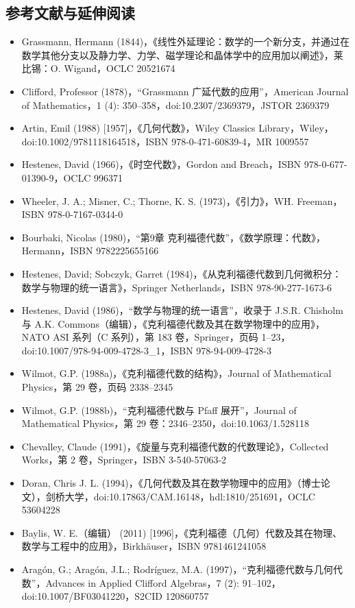 \subsection{参考文献与延伸阅读}
\begin{itemize}
\item Grassmann, Hermann (1844)，《线性外延理论：数学的一个新分支，并通过在数学其他分支以及静力学、力学、磁学理论和晶体学中的应用加以阐述》，莱比锡：O. Wigand，OCLC 20521674
\item Clifford, Professor (1878)，“Grassmann 广延代数的应用”，American Journal of Mathematics，1 (4): 350–358，doi:10.2307/2369379，JSTOR 2369379
\item Artin, Emil (1988) [1957]，《几何代数》，Wiley Classics Library，Wiley，doi:10.1002/9781118164518，ISBN 978-0-471-60839-4，MR 1009557
\item Hestenes, David (1966)，《时空代数》，Gordon and Breach，ISBN 978-0-677-01390-9，OCLC 996371
\item Wheeler, J. A.; Misner, C.; Thorne, K. S. (1973)，《引力》，W\.H. Freeman，ISBN 978-0-7167-0344-0
\item Bourbaki, Nicolas (1980)，“第9章 克利福德代数”，《数学原理：代数》，Hermann，ISBN 9782225655166
\item Hestenes, David; Sobczyk, Garret (1984)，《从克利福德代数到几何微积分：数学与物理的统一语言》，Springer Netherlands，ISBN 978-90-277-1673-6
\item Hestenes, David (1986)，“数学与物理的统一语言”，收录于 J.S.R. Chisholm 与 A.K. Commons（编辑），《克利福德代数及其在数学物理中的应用》，NATO ASI 系列（C 系列），第 183 卷，Springer，页码 1–23，doi:10.1007/978-94-009-4728-3\_1，ISBN 978-94-009-4728-3
\item Wilmot, G.P. (1988a)，《克利福德代数的结构》，Journal of Mathematical Physics，第 29 卷，页码 2338–2345
\item Wilmot, G.P. (1988b)，“克利福德代数与 Pfaff 展开”，Journal of Mathematical Physics，第 29 卷：2346–2350，doi:10.1063/1.528118
\item Chevalley, Claude (1991)，《旋量与克利福德代数的代数理论》，Collected Works，第 2 卷，Springer，ISBN 3-540-57063-2
\item Doran, Chris J. L. (1994)，《几何代数及其在数学物理中的应用》（博士论文），剑桥大学，doi:10.17863/CAM.16148，hdl:1810/251691，OCLC 53604228
\item Baylis, W. E.（编辑） (2011) [1996]，《克利福德（几何）代数及其在物理、数学与工程中的应用》，Birkhäuser，ISBN 9781461241058
\item Aragón, G.; Aragón, J.L.; Rodríguez, M.A. (1997)，“克利福德代数与几何代数”，Advances in Applied Clifford Algebras，7 (2): 91–102，doi:10.1007/BF03041220，S2CID 120860757

\end{itemize}

